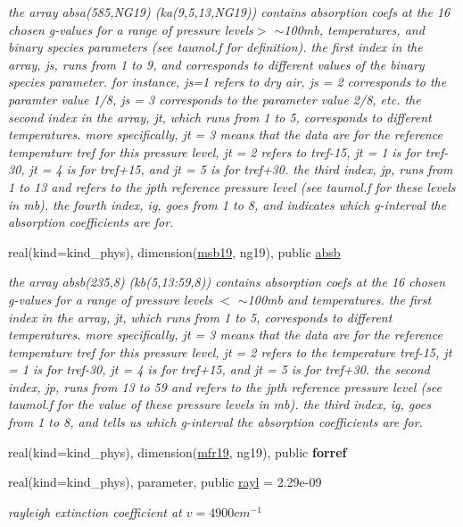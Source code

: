 \begin{Indent}
\begin{DoxyCompactItemize}
\begin{DoxyCompactList}\small\item\em the array absa(585,\+N\+G19) (ka(9,5,13,\+N\+G19)) contains absorption coefs at the 16 chosen g-\/values for a range of pressure levels$>$ $\sim$100mb, temperatures, and binary species parameters (see taumol.\+f for definition). the first index in the array, js, runs from 1 to 9, and corresponds to different values of the binary species parameter. for instance, js=1 refers to dry air, js = 2 corresponds to the paramter value 1/8, js = 3 corresponds to the parameter value 2/8, etc. the second index in the array, jt, which runs from 1 to 5, corresponds to different temperatures. more specifically, jt = 3 means that the data are for the reference temperature tref for this pressure level, jt = 2 refers to tref-\/15, jt = 1 is for tref-\/30, jt = 4 is for tref+15, and jt = 5 is for tref+30. the third index, jp, runs from 1 to 13 and refers to the jpth reference pressure level (see taumol.\+f for these levels in mb). the fourth index, ig, goes from 1 to 8, and indicates which g-\/interval the absorption coefficients are for. \end{DoxyCompactList}\item 
real(kind=kind\+\_\+phys), dimension(\hyperlink{group__module__radsw__kgbnn_ga42771fcf9dd17b5c9d0d03cb2bf1c923}{msb19}, ng19), public \hyperlink{group__module__radsw__kgbnn_gad1171c012a1615c4b98eb3e95276867d}{absb}
\begin{DoxyCompactList}\small\item\em the array absb(235,8) (kb(5,13\+:59,8)) contains absorption coefs at the 16 chosen g-\/values for a range of pressure levels $<$ $\sim$100mb and temperatures. the first index in the array, jt, which runs from 1 to 5, corresponds to different temperatures. more specifically, jt = 3 means that the data are for the reference temperature tref for this pressure level, jt = 2 refers to the temperature tref-\/15, jt = 1 is for tref-\/30, jt = 4 is for tref+15, and jt = 5 is for tref+30. the second index, jp, runs from 13 to 59 and refers to the jpth reference pressure level (see taumol.\+f for the value of these pressure levels in mb). the third index, ig, goes from 1 to 8, and tells us which g-\/interval the absorption coefficients are for. \end{DoxyCompactList}\item 
real(kind=kind\+\_\+phys), dimension(\hyperlink{group__module__radsw__kgbnn_ga57f837ef4316dc2441bca3fde3998156}{mfr19}, ng19), public {\bfseries forref}
\item 
real(kind=kind\+\_\+phys), parameter, public \hyperlink{group__module__radsw__kgbnn_gac79ad61e8d246d6075664df4201373d7}{rayl} = 2.\+29e-\/09
\begin{DoxyCompactList}\small\item\em rayleigh extinction coefficient at $v=4900cm^{-1}$ \end{DoxyCompactList}\end{DoxyCompactItemize}
\end{Indent}
